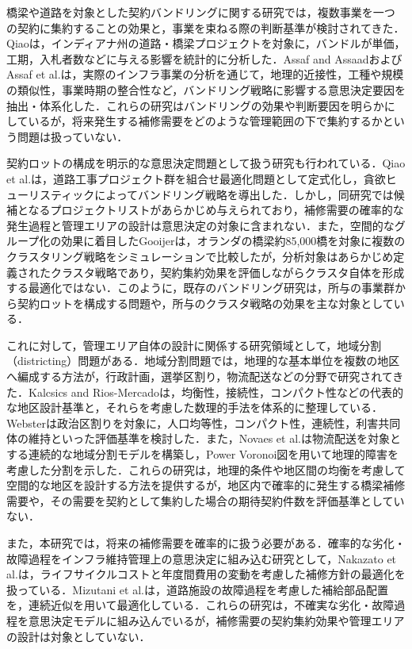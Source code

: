 \documentclass[Journal,letterpaper,InsideFigs,NoLineNumbers]{ascelike-new}
\begin{document}
橋梁や道路を対象とした契約バンドリングに関する研究では，複数事業を一つの契約に集約することの効果と，事業を束ねる際の判断基準が検討されてきた．Qiao\cite{qiao2019}は，インディアナ州の道路・橋梁プロジェクトを対象に，バンドルが単価，工期，入札者数などに与える影響を統計的に分析した．Assaf and Assaad\cite{assaf2023}およびAssaf et al.\cite{assaf2024}は，実際のインフラ事業の分析を通じて，地理的近接性，工種や規模の類似性，事業時期の整合性など，バンドリング戦略に影響する意思決定要因を抽出・体系化した．これらの研究はバンドリングの効果や判断要因を明らかにしているが，将来発生する補修需要をどのような管理範囲の下で集約するかという問題は扱っていない．

契約ロットの構成を明示的な意思決定問題として扱う研究も行われている．Qiao et al.\cite{qiao2026}は，道路工事プロジェクト群を組合せ最適化問題として定式化し，貪欲ヒューリスティックによってバンドリング戦略を導出した．しかし，同研究では候補となるプロジェクトリストがあらかじめ与えられており，補修需要の確率的な発生過程と管理エリアの設計は意思決定の対象に含まれない．また，空間的なグループ化の効果に着目したGooijer\cite{gooijer2024}は，オランダの橋梁約85,000橋を対象に複数のクラスタリング戦略をシミュレーションで比較したが，分析対象はあらかじめ定義されたクラスタ戦略であり，契約集約効果を評価しながらクラスタ自体を形成する最適化ではない．このように，既存のバンドリング研究は，所与の事業群から契約ロットを構成する問題や，所与のクラスタ戦略の効果を主な対象としている．

これに対して，管理エリア自体の設計に関係する研究領域として，地域分割（districting）問題がある．地域分割問題では，地理的な基本単位を複数の地区へ編成する方法が，行政計画，選挙区割り，物流配送などの分野で研究されてきた．Kalcsics and Rios-Mercado\cite{kalcsics2019}は，均衡性，接続性，コンパクト性などの代表的な地区設計基準と，それらを考慮した数理的手法を体系的に整理している．Webster\cite{webster2013}は政治区割りを対象に，人口均等性，コンパクト性，連続性，利害共同体の維持といった評価基準を検討した．また，Novaes et al.\cite{novaes2010}は物流配送を対象とする連続的な地域分割モデルを構築し，Power Voronoi図を用いて地理的障害を考慮した分割を示した．これらの研究は，地理的条件や地区間の均衡を考慮して空間的な地区を設計する方法を提供するが，地区内で確率的に発生する橋梁補修需要や，その需要を契約として集約した場合の期待契約件数を評価基準としていない．

また，本研究では，将来の補修需要を確率的に扱う必要がある．確率的な劣化・故障過程をインフラ維持管理上の意思決定に組み込む研究として，Nakazato et al.\cite{nakazato2023}は，ライフサイクルコストと年度間費用の変動を考慮した補修方針の最適化を扱っている．Mizutani et al.\cite{mizutani2025}は，道路施設の故障過程を考慮した補給部品配置を，連続近似を用いて最適化している．これらの研究は，不確実な劣化・故障過程を意思決定モデルに組み込んでいるが，補修需要の契約集約効果や管理エリアの設計は対象としていない．
\end{document}
